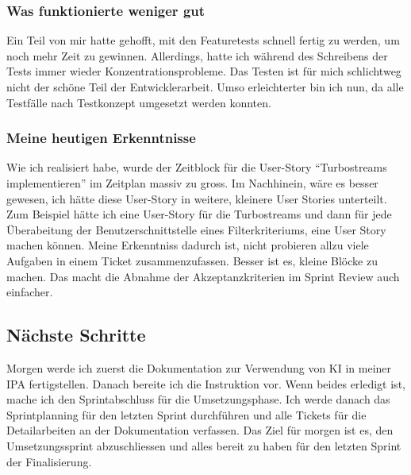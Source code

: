 \subsubsection*{Was funktionierte weniger gut}
Ein Teil von mir hatte gehofft, mit den Featuretests schnell fertig zu werden, um noch mehr Zeit zu gewinnen. Allerdings, hatte ich während des Schreibens der Tests
immer wieder Konzentrationsprobleme. Das Testen ist für mich schlichtweg nicht der schöne Teil der Entwicklerarbeit. Umso erleichterter bin ich nun, 
da alle Testfälle nach Testkonzept umgesetzt werden konnten. 

\subsubsection*{Meine heutigen Erkenntnisse}
Wie ich realisiert habe, wurde der Zeitblock für die User-Story ``Turbostreams implementieren'' im Zeitplan massiv zu gross. Im Nachhinein, wäre es 
besser gewesen, ich hätte diese User-Story in weitere, kleinere User Stories unterteilt. Zum Beispiel hätte ich 
eine User-Story für die Turbostreams und dann für jede Überabeitung der Benutzerschnittstelle eines Filterkriteriums, eine User Story machen können.
Meine Erkenntniss dadurch ist, nicht probieren allzu viele Aufgaben in einem Ticket zusammenzufassen. Besser ist es, kleine Blöcke zu machen.
Das macht die Abnahme der Akzeptanzkriterien im Sprint Review auch einfacher.

\subsection*{Nächste Schritte}
Morgen werde ich zuerst die Dokumentation zur Verwendung von KI in meiner IPA fertigstellen.
Danach bereite ich die Instruktion vor. Wenn beides erledigt ist, mache ich den Sprintabschluss für die Umsetzungsphase. 
Ich werde danach das Sprintplanning für den letzten Sprint durchführen und alle Tickets für die Detailarbeiten an der Dokumentation verfassen.
Das Ziel für morgen ist es, den Umsetzungssprint abzuschliessen und alles bereit zu haben für den letzten Sprint der Finalisierung.

\pagebreak
